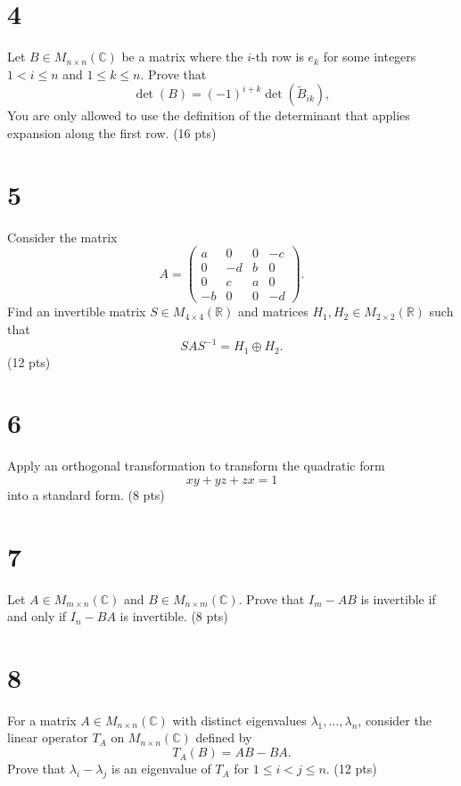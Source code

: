 \documentclass{article}
\begin{document}
\section*{4}
Let \( B \in M_{n \times n}(\mathbb{C}) \) be a matrix where the \( i \)-th row is \( e_k \) for some integers \( 1 < i \leq n \) and \( 1 \leq k \leq n \). Prove that
\[
\det(B) = (-1)^{i+k} \det(\tilde{B}_{ik}),
\]
You are only allowed to use the definition of the determinant that applies expansion along the first row. (16 pts)

\section*{5}
Consider the matrix
\[
A = 
\begin{pmatrix}
a & 0 & 0 & -c \\
0 & -d & b & 0 \\
0 & c & a & 0 \\
-b & 0 & 0 & -d
\end{pmatrix}.
\]
Find an invertible matrix \( S \in M_{4 \times 4}(\mathbb{R}) \) and matrices \( H_1, H_2 \in M_{2 \times 2}(\mathbb{R}) \) such that
\[
S A S^{-1} = H_1 \oplus H_2.
\]
(12 pts)

\section*{6}
Apply an orthogonal transformation to transform the quadratic form
\[
xy + yz + zx = 1
\]
into a standard form. (8 pts)

\section*{7}
Let \( A \in M_{m \times n}(\mathbb{C}) \) and \( B \in M_{n \times m}(\mathbb{C}) \). Prove that \( I_m - AB \) is invertible if and only if \( I_n - BA \) is invertible. (8 pts)

\section*{8}
For a matrix \( A \in M_{n \times n}(\mathbb{C}) \) with distinct eigenvalues \( \lambda_1, \dots, \lambda_n \), consider the linear operator \( T_A \) on \( M_{n \times n}(\mathbb{C}) \) defined by
\[
T_A(B) = AB - BA.
\]
Prove that \( \lambda_i - \lambda_j \) is an eigenvalue of \( T_A \) for \( 1 \leq i < j \leq n \). (12 pts)
\end{document}
